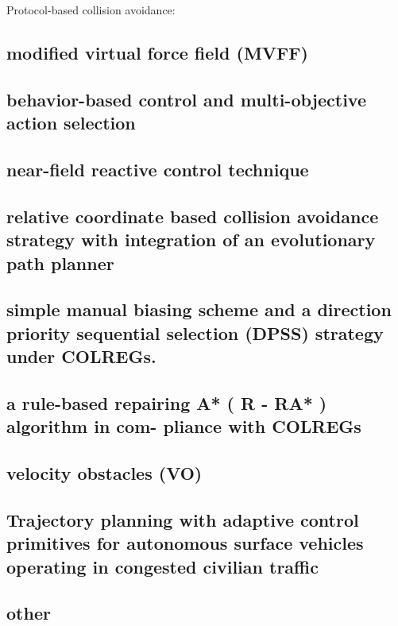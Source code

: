 Protocol-based collision avoidance:
\subsection{modified virtual force field (MVFF) }\cite{lee2004fuzzy}


\subsection{behavior-based control and multi-objective action selection} \cite{benjamin2004colregs,benjamin2006method}


\subsection{near-field reactive control technique }\cite{larson2007advances}


\subsection{relative coordinate based collision avoidance strategy with integration of an evolutionary path planner }\cite{zhuang2011motion}


\subsection{simple manual biasing scheme and a direction priority sequential selection (DPSS) strategy under COLREGs. }\cite{naeem2012colregs}


\subsection{ a rule-based repairing A* ( R - RA* ) algorithm in com-
    pliance with COLREGs }\cite{campbell2014automatic}


\subsection{velocity obstacles (VO) }\cite{kuwata2014safe}


\subsection{Trajectory planning with adaptive control primitives
    for autonomous surface vehicles operating in congested civilian traffic }\cite{shah2014trajectory}


\subsection{other } \cite{svec2013dynamics,vsvec2016adaptive,svec2012automated,svec2012usv}


